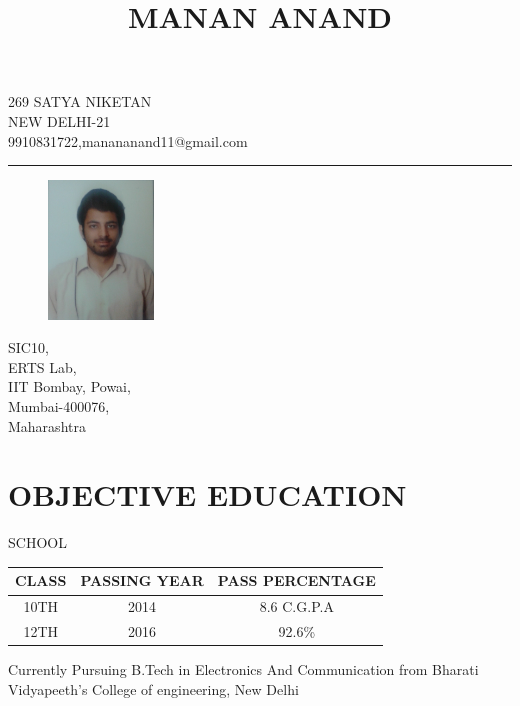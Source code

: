 \documentclass{article}
\date{}
\begin{document}
\title{MANAN ANAND}
\maketitle
\vspace{-2cm}

\begin{center}

{\large 269 SATYA NIKETAN\\
NEW DELHI-21\\
9910831722,manananand11@gmail.com\par} 
\end{center}
\noindent\rule{15cm}{1pt}


\begin{figure}
    \centering
    \includegraphics[width=0.25\textwidth]{manan_resume}
\end{figure}

SIC10,\\
ERTS Lab,\\
IIT Bombay, Powai,\\
Mumbai-400076,\\
Maharashtra

\section{OBJECTIVE EDUCATION}
\begin{center}
 SCHOOL
\end{center}

\begin{tabular}{ |c|c|c| } 
 \hline
 CLASS  & PASSING YEAR & PASS PERCENTAGE \\ 
\hline
 10TH & 2014 & 8.6 C.G.P.A \\ 
 12TH & 2016 & 92.6\% \\ 
 \hline
\end{tabular}

\large Currently Pursuing B.Tech in Electronics And Communication from Bharati Vidyapeeth's College of engineering, New Delhi
\end{document}
